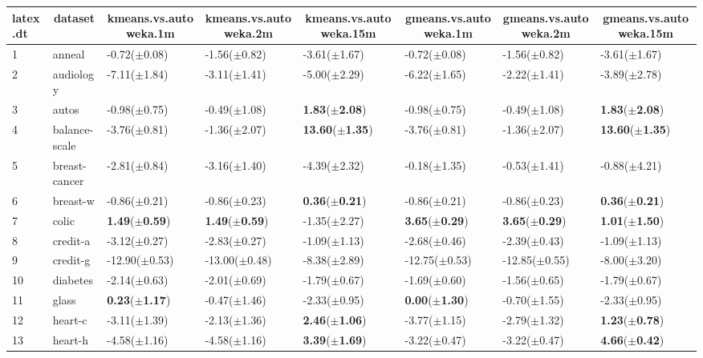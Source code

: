\begin{table}[!tbp]
\begin{center}
\begin{tabular}{llllllll}
\hline\hline
\multicolumn{1}{l}{latex.dt}&\multicolumn{1}{c}{dataset}&\multicolumn{1}{c}{kmeans.vs.autoweka.1m}&\multicolumn{1}{c}{kmeans.vs.autoweka.2m}&\multicolumn{1}{c}{kmeans.vs.autoweka.15m}&\multicolumn{1}{c}{gmeans.vs.autoweka.1m}&\multicolumn{1}{c}{gmeans.vs.autoweka.2m}&\multicolumn{1}{c}{gmeans.vs.autoweka.15m}\tabularnewline
\hline
1&anneal& -0.72($\pm$0.08)& -1.56($\pm$0.82)& -3.61($\pm$1.67)& -0.72($\pm$0.08)& -1.56($\pm$0.82)& -3.61($\pm$1.67)\tabularnewline
2&audiology& -7.11($\pm$1.84)& -3.11($\pm$1.41)& -5.00($\pm$2.29)& -6.22($\pm$1.65)& -2.22($\pm$1.41)& -3.89($\pm$2.78)\tabularnewline
3&autos& -0.98($\pm$0.75)& -0.49($\pm$1.08)&\textbf{  1.83}($\pm$\textbf{2.08})& -0.98($\pm$0.75)& -0.49($\pm$1.08)&\textbf{  1.83}($\pm$\textbf{2.08})\tabularnewline
4&balance-scale& -3.76($\pm$0.81)& -1.36($\pm$2.07)&\textbf{ 13.60}($\pm$\textbf{1.35})& -3.76($\pm$0.81)& -1.36($\pm$2.07)&\textbf{ 13.60}($\pm$\textbf{1.35})\tabularnewline
5&breast-cancer& -2.81($\pm$0.84)& -3.16($\pm$1.40)& -4.39($\pm$2.32)& -0.18($\pm$1.35)& -0.53($\pm$1.41)& -0.88($\pm$4.21)\tabularnewline
6&breast-w& -0.86($\pm$0.21)& -0.86($\pm$0.23)&\textbf{  0.36}($\pm$\textbf{0.21})& -0.86($\pm$0.21)& -0.86($\pm$0.23)&\textbf{  0.36}($\pm$\textbf{0.21})\tabularnewline
7&colic&\textbf{  1.49}($\pm$\textbf{0.59})&\textbf{  1.49}($\pm$\textbf{0.59})& -1.35($\pm$2.27)&\textbf{  3.65}($\pm$\textbf{0.29})&\textbf{  3.65}($\pm$\textbf{0.29})&\textbf{  1.01}($\pm$\textbf{1.50})\tabularnewline
8&credit-a& -3.12($\pm$0.27)& -2.83($\pm$0.27)& -1.09($\pm$1.13)& -2.68($\pm$0.46)& -2.39($\pm$0.43)& -1.09($\pm$1.13)\tabularnewline
9&credit-g&-12.90($\pm$0.53)&-13.00($\pm$0.48)& -8.38($\pm$2.89)&-12.75($\pm$0.53)&-12.85($\pm$0.55)& -8.00($\pm$3.20)\tabularnewline
10&diabetes& -2.14($\pm$0.63)& -2.01($\pm$0.69)& -1.79($\pm$0.67)& -1.69($\pm$0.60)& -1.56($\pm$0.65)& -1.79($\pm$0.67)\tabularnewline
11&glass&\textbf{  0.23}($\pm$\textbf{1.17})& -0.47($\pm$1.46)& -2.33($\pm$0.95)&\textbf{  0.00}($\pm$\textbf{1.30})& -0.70($\pm$1.55)& -2.33($\pm$0.95)\tabularnewline
12&heart-c& -3.11($\pm$1.39)& -2.13($\pm$1.36)&\textbf{  2.46}($\pm$\textbf{1.06})& -3.77($\pm$1.15)& -2.79($\pm$1.32)&\textbf{  1.23}($\pm$\textbf{0.78})\tabularnewline
13&heart-h& -4.58($\pm$1.16)& -4.58($\pm$1.16)&\textbf{  3.39}($\pm$\textbf{1.69})& -3.22($\pm$0.47)& -3.22($\pm$0.47)&\textbf{  4.66}($\pm$\textbf{0.42})\tabularnewline

\end{tabular}
\end{center}
\end{table}
